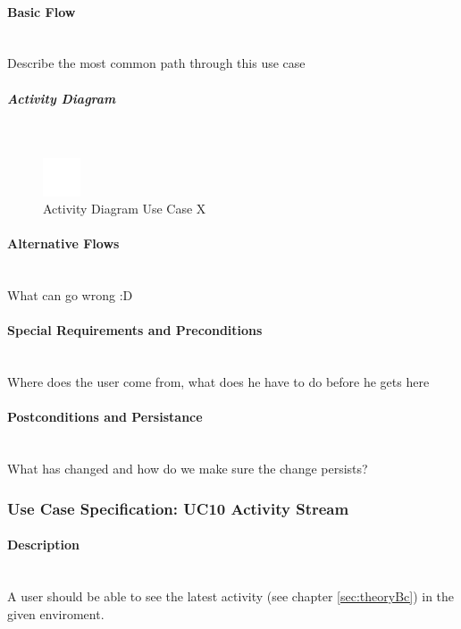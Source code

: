 \paragraph*{Basic Flow} \mbox{}\\

Describe the most common path through this use case

\subparagraph{Activity Diagram}\mbox{}\\
\begin{figure}[h]
	\centering
	\includegraphics[width=0.1\textwidth]{Content/Domain/placeholder.png}
	\caption{Activity Diagram Use Case X}
	\label{fig:label10}
\end{figure}

\paragraph*{Alternative Flows}\mbox{}\\
What can go wrong :D

\paragraph*{Special Requirements and Preconditions}\mbox{}\\
Where does the user come from, what does he have to do before he gets here

\paragraph*{Postconditions and Persistance}\mbox{}\\
What has changed and how do we make sure the change persists?

\newpage
\subsubsection{Use Case Specification: \ac{UC}10 Activity Stream}
\label{sec:domainBbk}

\paragraph*{Description}\mbox{}\\
A user should be able to see the latest activity (see chapter \ref{sec:theoryBc}) in the given enviroment.

